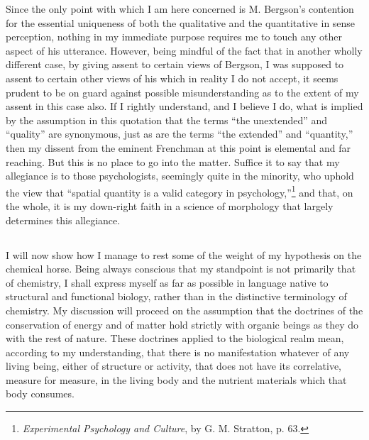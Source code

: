 \documentclass[a4paper, 11pt, oneside, polutonikogreek, english]{article}
\begin{document}
Since the only point with which I am here concerned is M. Bergson's contention for the essential uniqueness of both the qualitative and the quantitative in sense perception, nothing in my immediate purpose requires me to touch any other aspect of his utterance. However, being mindful of the fact that in another wholly different case, by giving assent to certain views of Bergson, I was supposed to assent to certain other views of his which in reality I do not accept, it seems prudent to be on guard against possible misunderstanding as to the extent of my assent in this case also. If I rightly understand, and I believe I do, what is implied by the assumption in this quotation that the terms ``the unextended'' and ``quality'' are synonymous, just as are the terms ``the extended'' and ``quantity,'' then my dissent from the eminent Frenchman at this point is elemental and far reaching. But this is no place to go into the matter. Suffice it to say that my allegiance is to those psychologists, seemingly quite in the minority, who uphold the view that ``spatial quantity is a valid category in psychology,''\footnote{\emph{Experimental Psychology and Culture}, by G. M. Stratton, p. 63.} and that, on the whole, it is my down-right faith in a science of morphology that largely determines this allegiance.

\subsection{}
\paragraph{}
I will now show how I manage to rest some of the weight of my hypothesis on the chemical horse. Being always conscious that my standpoint is not primarily that of chemistry, I shall express myself as far as possible in language native to structural and functional biology, rather than in the distinctive terminology of chemistry. My discussion will proceed on the assumption that the doctrines of the conservation of energy and of matter hold strictly with organic beings as they do with the rest of nature. These doctrines applied to the biological realm mean, according to my understanding, that there is no manifestation whatever of any living being, either of structure or activity, that does not have its correlative, measure for measure, in the living body and the nutrient materials which that body consumes.
\end{document}
